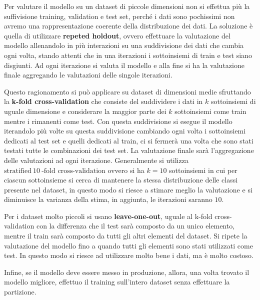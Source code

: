 Per valutare il modello su un dataset di piccole dimensioni non si effettua più
la suffivisione training, validation e test set, perché i dati sono pochissimi non 
avremo una rappresentazione coerente della distribuzione dei dati. La soluzione è
quella di utilizzare \textbf{repeted holdout}, ovvero effettuare la valutazione 
del modello allenandolo in più interazioni su una suddivisione dei dati che cambia
ogni volta, stando attenti che in una iterazioni i sottoinsiemi di train e test siano
disgiunti. Ad ogni iterazione si valuta il modello e alla fine si ha la valutazione
finale aggregando le valutazioni delle singole iterazioni.

Questo ragionamento si può applicare su dataset di dimensioni medie sfruttando la
\textbf{k-fold cross-validation} che consiste del suddividere i dati in $k$ 
sottoinsiemi di uguale dimensione e considerare la maggior parte dei $k$ sottoinsiemi
come train mentre i rimanenti come test. Con questa suddivisione si esegue il modello
iterandolo più volte su questa suddivisione cambiando ogni volta i sottoinsiemi
dedicati al test set e quelli dedicati al train, ci si fermerà una volta 
che sono stati testati tutte le combinazioni dei test set. La valutazione finale
sarà l'aggregazione delle valutazioni ad ogni iterazione. Generalmente si utilizza
$\text{stratified} \ 10 \ \text{-fold cross-validation}$ ovvero si ha $k=10$ sottoinsiemi
in cui per ciascun sottoinsieme si cerca di mantenere la stessa distribuzione delle
classi presente nel dataset, in questo modo si riesce a stimare meglio la valutazione
e si diminuisce la varianza della stima, in aggiunta, le iterazioni saranno $10$.

Per i dataset molto piccoli si usano \textbf{leave-one-out}, uguale al k-fold 
cross-validation con la differenza che il test sarà composto da un unico elemento,
mentre il train sarà composto da tutti gli altri elementi del dataset. Si ripete
la valutazione del modello fino a quando tutti gli elementi sono stati utilizzati
come test. In questo modo si riesce ad utilizzare molto bene i dati, ma è molto
costoso.

Infine, se il modello deve essere messo in produzione, allora, una volta trovato
il modello migliore, effettuo il training sull'intero dataset senza effettuare la
partizione.


